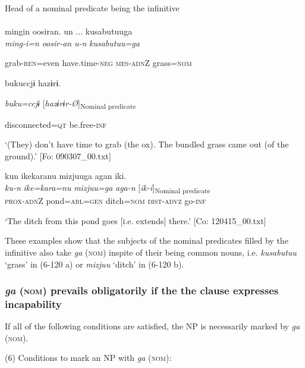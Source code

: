 \ea\label{ex:6-120}
 Head of a nominal predicate being the infinitive\\

 \ea{}\\
\gll  {\TM}  mingin  oosiran.  un ...  kusabutuuga\\

      \textit{ming-i=n}  \textit{oosir-an}  \textit{u-n}  \textit{kusabutuu=ga}

      grab-\textsc{ren}=even  have.time-\textsc{neg}  \textsc{mes}-\textsc{adn}Z  grass=\textsc{nom}

      bukuccjɨ  hazɨrɨ.

      \textit{buku=ccjɨ}  [\textit{hazɨrɨr-Ø}]\textsubscript{Nominal predicate}

      disconnected=\textsc{qt}  be.free-\textsc{inf}

\glt ‘(They) don’t have time to grab (the ox). The bundled grass came out (of the ground).’ [Fo: 090307\_00.txt]
\z

 \ex {\TM}  kun  {\textbar}ike{\textbar}karanu  mizjuuga  agan  iki.\\
\gll \textit{ku-n}  \textit{ike=kara=nu}  \textit{mizjuu=ga}  \textit{aga-n}  [\textit{ik-i}]\textsubscript{Nominal predicate}\\

      \textsc{prox}-\textsc{adn}Z  pond=\textsc{abl}=\textsc{gen}  ditch=\textsc{nom}  \textsc{dist}-\textsc{advz}  go{}-\textsc{inf}

\glt ‘The ditch from this pond goes [i.e. extends] there.’ [Co: 120415\_00.txt]
\z

These examples show that the subjects of the nominal predicates filled by the infinitive also take \textit{ga} (\textsc{nom}) inspite of their being common nouns, i.e. \textit{kusabutuu} ‘grass’ in (6-120 a) or \textit{mizjuu} ‘ditch’ in (6-120 b).

\subsubsection{\textit{ga} (\textsc{nom}) prevails obligatorily if the the clause expresses incapability}

If all of the following conditions are satisfied, the NP is necessarily marked by \textit{ga} (\textsc{nom}).

\begin{styleBeschriftung}
\textmd{(6) Conditions to mark an NP with} \textmd{\textit{ga}}\textmd{ (\textsc{nom}):}
\end{styleBeschriftung}

